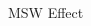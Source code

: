 \documentclass[9pt]{beamer}
\begin{document}
\begin{darkframes}
\begin{frame}{MSW Effect}
{\begin{columns}[T]
\begin{column}{0.5\textwidth}
\begin{itemize}
\end{itemize}









\end{column}
\end{columns}


}




\end{frame}







%
%
%
%
%
%
%
%
%
%
%
%
%

\end{darkframes}
\end{document}
